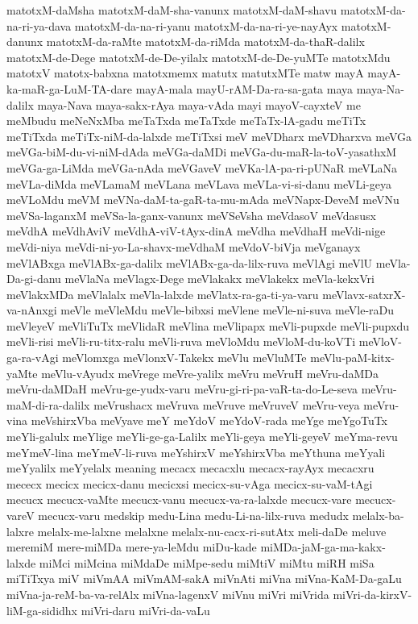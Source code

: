 {matotxM-daMsha
matotxM-daM-sha-vanunx
matotxM-daM-shavu
matotxM-da-na-ri-ya-dava
matotxM-da-na-ri-yanu
matotxM-da-na-ri-ye-nayAyx
matotxM-danunx
matotxM-da-raMte
matotxM-da-riMda
matotxM-da-thaR-dalilx
matotxM-de-Dege
matotxM-de-De-yilalx
matotxM-de-De-yuMTe
matotxMdu
matotxV
matotx-babxna
matotxmemx
matutx
matutxMTe
matw
mayA
mayA-ka-maR-ga-LuM-TA-dare
mayA-mala
mayU-rAM-Da-ra-sa-gata
maya
maya-Na-dalilx
maya-Nava
maya-sakx-rAya
maya-vAda
mayi
mayoV-cayxteV
me
meMbudu
meNeNxMba
meTaTxda
meTaTxde
meTaTx-lA-gadu
meTiTx
meTiTxda
meTiTx-niM-da-lalxde
meTiTxsi
meV
meVDharx
meVDharxva
meVGa
meVGa-biM-du-vi-niM-dAda
meVGa-daMDi
meVGa-du-maR-la-toV-yasathxM
meVGa-ga-LiMda
meVGa-nAda
meVGaveV
meVKa-lA-pa-ri-pUNaR
meVLaNa
meVLa-diMda
meVLamaM
meVLana
meVLava
meVLa-vi-si-danu
meVLi-geya
meVLoMdu
meVM
meVNa-daM-ta-gaR-ta-mu-mAda
meVNapx-DeveM
meVNu
meVSa-laganxM
meVSa-la-ganx-vanunx
meVSeVsha
meVdasoV
meVdasusx
meVdhA
meVdhAviV
meVdhA-viV-tAyx-dinA
meVdha
meVdhaH
meVdi-nige
meVdi-niya
meVdi-ni-yo-La-shavx-meVdhaM
meVdoV-biVja
meVganayx
meVlABxga
meVlABx-ga-dalilx
meVlABx-ga-da-lilx-ruva
meVlAgi
meVlU
meVla-Da-gi-danu
meVlaNa
meVlagx-Dege
meVlakakx
meVlakekx
meVla-kekxVri
meVlakxMDa
meVlalalx
meVla-lalxde
meVlatx-ra-ga-ti-ya-varu
meVlavx-satxrX-va-nAnxgi
meVle
meVleMdu
meVle-bibxsi
meVlene
meVle-ni-suva
meVle-raDu
meVleyeV
meVliTuTx
meVlidaR
meVlina
meVlipapx
meVli-pupxde
meVli-pupxdu
meVli-risi
meVli-ru-titx-ralu
meVli-ruva
meVloMdu
meVloM-du-koVTi
meVloV-ga-ra-vAgi
meVlomxga
meVlonxV-Takekx
meVlu
meVluMTe
meVlu-paM-kitx-yaMte
meVlu-vAyudx
meVrege
meVre-yalilx
meVru
meVruH
meVru-daMDa
meVru-daMDaH
meVru-ge-yudx-varu
meVru-gi-ri-pa-vaR-ta-do-Le-seva
meVru-maM-di-ra-dalilx
meVrushacx
meVruva
meVruve
meVruveV
meVru-veya
meVru-vina
meVshirxVba
meVyave
meY
meYdoV
meYdoV-rada
meYge
meYgoTuTx
meYli-galulx
meYlige
meYli-ge-ga-Lalilx
meYli-geya
meYli-geyeV
meYma-revu
meYmeV-lina
meYmeV-li-ruva
meYshirxV
meYshirxVba
meYthuna
meYyali
meYyalilx
meYyelalx
meaning
mecacx
mecacxlu
mecacx-rayAyx
mecacxru
mececx
mecicx
mecicx-danu
mecicxsi
mecicx-su-vAga
mecicx-su-vaM-tAgi
mecucx
mecucx-vaMte
mecucx-vanu
mecucx-va-ra-lalxde
mecucx-vare
mecucx-vareV
mecucx-varu
medskip
medu-Lina
medu-Li-na-lilx-ruva
medudx
melalx-ba-lalxre
melalx-me-lalxne
melalxne
melalx-nu-cacx-ri-sutAtx
meli-daDe
meluve
meremiM
mere-miMDa
mere-ya-leMdu
miDu-kade
miMDa-jaM-ga-ma-kakx-lalxde
miMci
miMcina
miMdaDe
miMpe-sedu
miMtiV
miMtu
miRH
miSa
miTiTxya
miV
miVmAA
miVmAM-sakA
miVnAti
miVna
miVna-KaM-Da-gaLu
miVna-ja-reM-ba-va-relAlx
miVna-lagenxV
miVnu
miVri
miVrida
miVri-da-kirxV-liM-ga-sididhx
miVri-daru
miVri-da-vaLu
}
